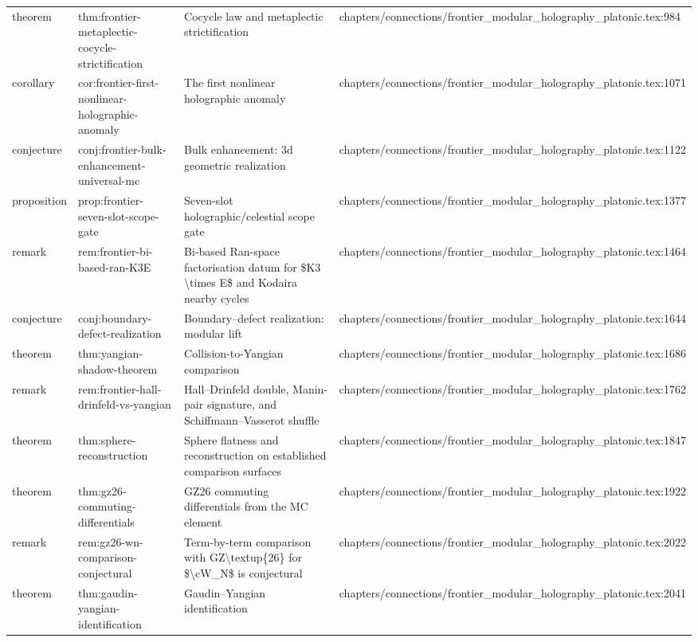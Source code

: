 \documentclass[11pt]{article}
\begin{document}
\begin{longtable}{L{0.10\textwidth}L{0.26\textwidth}L{0.42\textwidth}L{0.22\textwidth}}
theorem & thm:frontier-metaplectic-cocycle-strictification & Cocycle law and metaplectic strictification & chapters/connections/frontier\_modular\_holography\_platonic.tex:984\\
corollary & cor:frontier-first-nonlinear-holographic-anomaly & The first nonlinear holographic anomaly & chapters/connections/frontier\_modular\_holography\_platonic.tex:1071\\
conjecture & conj:frontier-bulk-enhancement-universal-mc & Bulk enhancement: 3d geometric realization & chapters/connections/frontier\_modular\_holography\_platonic.tex:1122\\
proposition & prop:frontier-seven-slot-scope-gate & Seven-slot holographic/celestial scope gate & chapters/connections/frontier\_modular\_holography\_platonic.tex:1377\\
remark & rem:frontier-bi-based-ran-K3E & Bi-based Ran-space factorisation datum for \$K3 \textbackslash{}times E\$ and Kodaira nearby cycles & chapters/connections/frontier\_modular\_holography\_platonic.tex:1464\\
conjecture & conj:boundary-defect-realization & Boundary--defect realization: modular lift & chapters/connections/frontier\_modular\_holography\_platonic.tex:1644\\
theorem & thm:yangian-shadow-theorem & Collision-to-Yangian comparison & chapters/connections/frontier\_modular\_holography\_platonic.tex:1686\\
remark & rem:frontier-hall-drinfeld-vs-yangian & Hall--Drinfeld double, Manin-pair signature, and Schiffmann--Vasserot shuffle & chapters/connections/frontier\_modular\_holography\_platonic.tex:1762\\
theorem & thm:sphere-reconstruction & Sphere flatness and reconstruction on established comparison surfaces & chapters/connections/frontier\_modular\_holography\_platonic.tex:1847\\
theorem & thm:gz26-commuting-differentials & GZ26 commuting differentials from the MC element & chapters/connections/frontier\_modular\_holography\_platonic.tex:1922\\
remark & rem:gz26-wn-comparison-conjectural & Term-by-term comparison with GZ\textbackslash{}textup\{26\} for \$\textbackslash{}cW\_N\$ is conjectural & chapters/connections/frontier\_modular\_holography\_platonic.tex:2022\\
theorem & thm:gaudin-yangian-identification & Gaudin--Yangian identification & chapters/connections/frontier\_modular\_holography\_platonic.tex:2041\\

\end{longtable}
\end{document}
